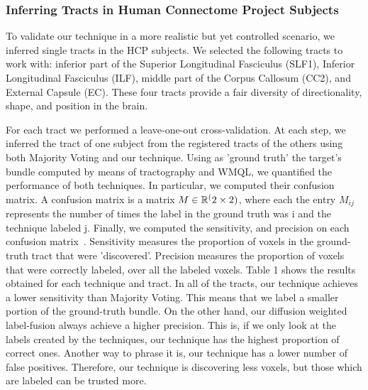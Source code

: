 \subsubsection{Inferring Tracts in Human Connectome Project Subjects}
To validate our technique in a more realistic but yet controlled scenario, we
inferred single tracts in the HCP subjects. We selected the following tracts to
work with: inferior part of the Superior Longitudinal Fasciculus (SLF1),
Inferior Longitudinal Fasciculus (ILF), middle part of the
Corpus Callosum (CC2), and External Capsule (EC). These four tracts provide
a fair diversity of directionality, shape, and position in the brain.

For each tract we performed a leave-one-out cross-validation. At each step, we
inferred the tract of one subject from the registered tracts of the others
using both Majority Voting and our technique. Using as 'ground truth' the
target's bundle computed by means of tractography and WMQL, we quantified the
performance of both techniques. In particular, we computed their confusion matrix.
A confusion matrix is a matrix $M \in \mathbb{R}^(2\times2)$, where each the entry $M_{ij}$
represents the number of times the label in the ground truth was i and the
technique labeled j. Finally, we computed the sensitivity, and precision on
each confusion matrix~\cite{Kuhn2013}. Sensitivity measures the proportion of voxels
in the ground-truth tract that were 'discovered'. Precision measures the proportion
of voxels that were correctly labeled, over all the labeled voxels. Table 1 shows
the results obtained for each technique and tract. In all of the tracts, our
technique achieves a lower sensitivity than Majority Voting. This means that
we label a smaller portion of the ground-truth bundle. On the other hand,
our diffusion weighted label-fusion always achieve a higher precision. This
is, if we only look at the labels created by the techniques, our technique
has the highest proportion of correct ones. Another way to phrase it is, our
technique has a lower number of false positives.
Therefore, our technique is discovering less voxels, but those which are labeled
can be trusted more.

